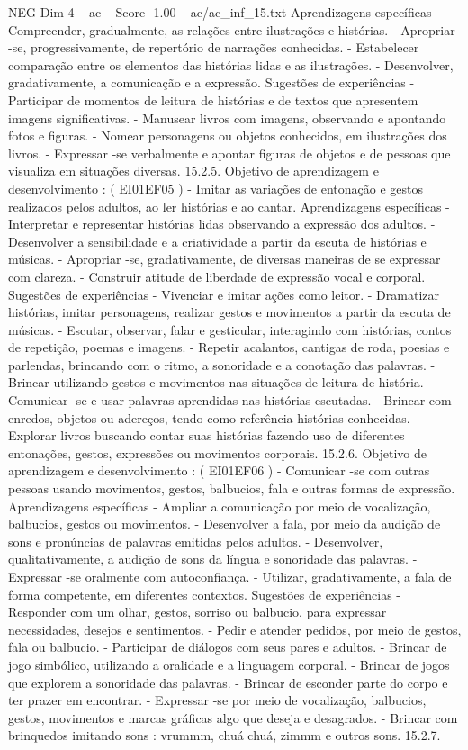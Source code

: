 \begin{textsample}{NEG Dim 4 – ac – Score -1.00 – ac/ac\_inf\_15.txt}
Aprendizagens específicas - Compreender, gradualmente, as relações entre ilustrações e histórias. - Apropriar -se, progressivamente, de repertório de narrações conhecidas. - Estabelecer comparação entre os elementos das histórias lidas e as ilustrações. - Desenvolver, gradativamente, a comunicação e a expressão.
Sugestões de experiências - Participar de momentos de leitura de histórias e de textos que apresentem imagens significativas. - Manusear livros com imagens, observando e apontando fotos e figuras. - Nomear personagens ou objetos conhecidos, em ilustrações dos livros. - Expressar -se verbalmente e apontar figuras de objetos e de pessoas que visualiza em situações diversas. 15.2.5.
Objetivo de aprendizagem e desenvolvimento : ( EI01EF05 ) - Imitar as variações de entonação e gestos realizados pelos adultos, ao ler histórias e ao cantar.
Aprendizagens específicas - Interpretar e representar histórias lidas observando a expressão dos adultos. - Desenvolver a sensibilidade e a criatividade a partir da escuta de histórias e músicas. - Apropriar -se, gradativamente, de diversas maneiras de se expressar com clareza. - Construir atitude de liberdade de expressão vocal e corporal.
Sugestões de experiências - Vivenciar e imitar ações como leitor. - Dramatizar histórias, imitar personagens, realizar gestos e movimentos a partir da escuta de músicas. - Escutar, observar, falar e gesticular, interagindo com histórias, contos de repetição, poemas e imagens. - Repetir acalantos, cantigas de roda, poesias e parlendas, brincando com o ritmo, a sonoridade e a conotação das palavras. - Brincar utilizando gestos e movimentos nas situações de leitura de história. - Comunicar -se e usar palavras aprendidas nas histórias escutadas. - Brincar com enredos, objetos ou adereços, tendo como referência histórias conhecidas. - Explorar livros buscando contar suas histórias fazendo uso de diferentes entonações, gestos, expressões ou movimentos corporais. 15.2.6.
Objetivo de aprendizagem e desenvolvimento : ( EI01EF06 ) - Comunicar -se com outras pessoas usando movimentos, gestos, balbucios, fala e outras formas de expressão.
Aprendizagens específicas - Ampliar a comunicação por meio de vocalização, balbucios, gestos ou movimentos. - Desenvolver a fala, por meio da audição de sons e pronúncias de palavras emitidas pelos adultos. - Desenvolver, qualitativamente, a audição de sons da língua e sonoridade das palavras. - Expressar -se oralmente com autoconfiança. - Utilizar, gradativamente, a fala de forma competente, em diferentes contextos.
Sugestões de experiências - Responder com um olhar, gestos, sorriso ou balbucio, para expressar necessidades, desejos e sentimentos. - Pedir e atender pedidos, por meio de gestos, fala ou balbucio. - Participar de diálogos com seus pares e adultos. - Brincar de jogo simbólico, utilizando a oralidade e a linguagem corporal. - Brincar de jogos que explorem a sonoridade das palavras. - Brincar de esconder parte do corpo e ter prazer em encontrar. - Expressar -se por meio de vocalização, balbucios, gestos, movimentos e marcas gráficas algo que deseja e desagrados. - Brincar com brinquedos imitando sons : vrummm, chuá chuá, zimmm e outros sons. 15.2.7.

\end{textsample}
